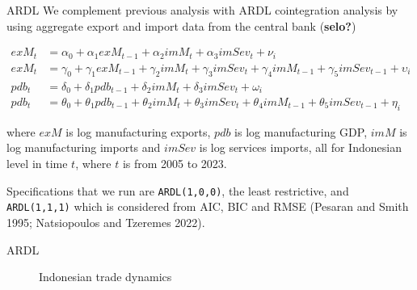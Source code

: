 \documentclass[
  ignorenonframetext,
]{beamer}
\begin{document}
\begin{frame}[fragile,s]{ARDL}
\label{ardl}
We complement previous analysis with ARDL cointegration analysis by
using aggregate export and import data from the central bank
(\textbf{selo?})

\begin{align}
exM_t&=\alpha_0+\alpha_1 exM_{t-1}+\alpha_2 imM_t+\alpha_3 imSev_t+\nu_i \\
exM_t&=\gamma_0+\gamma_1 exM_{t-1}+\gamma_2 imM_t+\gamma_3 imSev_t+ \gamma_4 imM_{t-1}+\gamma_5 imSev_{t-1}+\upsilon_i \\
pdb_t&=\delta_0+\delta_1 pdb_{t-1}+\delta_2 imM_t+\delta_3 imSev_t+\omega_i \\
pdb_t&=\theta_0+\theta_1 pdb_{t-1}+\theta_2 imM_t+\theta_3 imSev_t+ \theta_4 imM_{t-1}+\theta_5 imSev_{t-1}+\eta_i
\end{align}

where \(exM\) is log manufacturing exports, \(pdb\) is log manufacturing
GDP, \(imM\) is log manufacturing imports and \(imSev\) is log services
imports, all for Indonesian level in time \(t\), where \(t\) is from
2005 to 2023.

Specifications that we run are \texttt{ARDL(1,0,0)}, the least
restrictive, and \texttt{ARDL(1,1,1)} which is considered from AIC, BIC
and RMSE (Pesaran and Smith 1995; Natsiopoulos and Tzeremes 2022).
\end{frame}

\begin{frame}{ARDL}
\label{ardl-1}
\begin{figure}


\caption{\label{fig-idn}Indonesian trade dynamics}

\end{figure}%
\end{frame}
\end{document}
